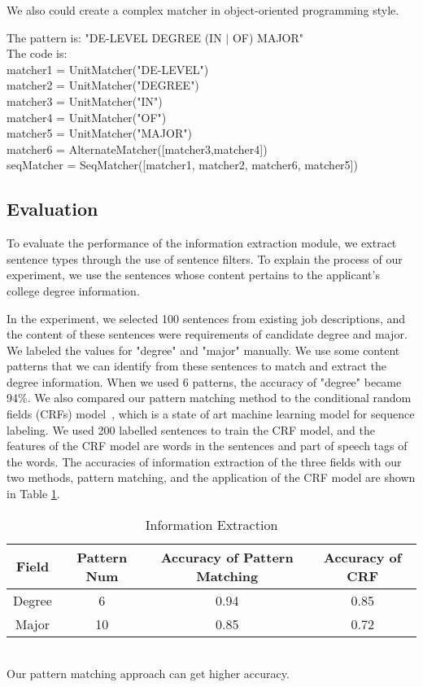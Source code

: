 We also could create a complex matcher in object-oriented programming style.

\begin{framed}
\small
\noindent
The pattern is:  "DE-LEVEL DEGREE (IN $\vert$ OF) MAJOR" \\
The code is: \\
matcher1 = UnitMatcher("DE-LEVEL") \\
matcher2 = UnitMatcher("DEGREE")  \\
matcher3 = UnitMatcher("IN")   \\
matcher4 = UnitMatcher("OF")   \\
matcher5 = UnitMatcher("MAJOR")  \\
matcher6 = AlternateMatcher([matcher3,matcher4])   \\
seqMatcher = SeqMatcher([matcher1, matcher2, matcher6, matcher5])

\end{framed}


\subsection{Evaluation}

To evaluate the performance of the information extraction module, we extract sentence types through the use of sentence filters. To explain the process of our experiment, we use the sentences whose content pertains to the applicant's college degree information.

In the experiment, we selected 100 sentences from existing job descriptions, and the content of these sentences were requirements of candidate degree and major. We labeled the values for "degree" and "major" manually. We use some content patterns that we can identify from these sentences to match and extract the degree information. When we used 6 patterns, the accuracy of "degree" became 94\%. We also compared our pattern matching method to the conditional random fields (CRFs) model~\cite{lafferty2001conditional}, which is a state of art machine learning model for sequence labeling. We used 200 labelled sentences to train the CRF model, and the features of the CRF model are words in the sentences and part of speech tags of the words. The accuracies of information extraction of the three fields with our two methods, pattern matching, and the application of the CRF model are shown in Table \ref{tab:ieaccura}.


\begin{table}[ht]
\caption{Information Extraction} %
\centering %
\begin{tabular}{   | c | c | c | c |   }
 \hline
          Field   & Pattern Num & Accuracy of Pattern Matching  & Accuracy of CRF   \\
 \hline
          Degree  & 6           & 0.94       &  0.85  \\
 \hline
          Major   & 10          & 0.85       &  0.72  \\
 \hline

\end{tabular}
\label{tab:ieaccura} %
\\Our pattern matching approach can get higher accuracy.
\end{table}
